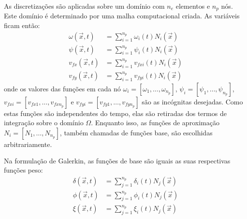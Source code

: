 As discretizações são aplicadas sobre um domínio com $n_e$ elementos e $n_p$ nós.
Este domínio é determinado por uma malha computacional criada.
As variáveis ficam então:
\begin{align}
    \omega(\vec{x}, t) &= \sum_{i=1}^{n_p} \omega_i(t) N_i(\vec{x}) \\
    \psi(\vec{x}, t) &= \sum_{i=1}^{n_p} \psi_i(t) N_i(\vec{x}) \\
    v_{fx}(\vec{x}, t) &= \sum_{i=1}^{n_p} v_{fxi}(t) N_i(\vec{x}) \\
    v_{fy}(\vec{x}, t) &= \sum_{i=1}^{n_p} v_{fyi}(t) N_i(\vec{x}) 
\end{align}
onde os valores das funções em cada nó $\omega_i = [\omega_1, \ldots, \omega_{n_p}]$, $\psi_i = [\psi_1, \ldots, \psi_{n_p}]$, $v_{fxi} = [v_{fx1}, \ldots, v_{fxn_p}]$ e $v_{fyi} = [v_{fy1}, \ldots, v_{fyn_p}]$ são as incógnitas desejadas.
Como estas funções são independentes do tempo, elas são retiradas dos termos de integração sobre o domínio $\Omega$.
Enquanto isso, as funções de aproximação $N_{i} = [N_{1}, \ldots, N_{n_p}]$, também chamadas de funções base, são escolhidas arbitrariamente.

Na formulação de Galerkin, as funções de base são iguais as suas respectivas funções peso:
\begin{align}
    \delta(\vec{x}, t) &= \sum_{j=1}^{n_p} \delta_i(t) N_j(\vec{x}) \\
    \phi(\vec{x}, t) &= \sum_{j=1}^{n_p} \phi_i(t) N_j(\vec{x}) \\
    \xi(\vec{x}, t) &= \sum_{j=1}^{n_p} \xi_i(t) N_j(\vec{x})
\end{align}

